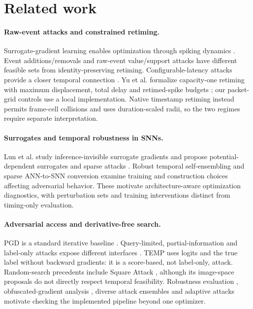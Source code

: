 \section{Related work}\label{sec:related}
\paragraph{Raw-event attacks and constrained retiming.}
Surrogate-gradient learning enables optimization through spiking dynamics \cite{neftci2019}. Event additions/removals \cite{buchel2022attacks} and raw-event value/support attacks \cite{yao2024rawevent} have different feasible sets from identity-preserving retiming. Configurable-latency attacks provide a closer temporal connection \cite{du2026latencies}. Yu et al. formalize capacity-one retiming with maximum displacement, total delay and retimed-spike budgets \cite{yu2026}; our packet-grid controls use a local implementation. Native timestamp retiming instead permits frame-cell collisions and uses duration-scaled radii, so the two regimes require separate interpretation.

\paragraph{Surrogates and temporal robustness in SNNs.}
Lun et al. study inference-invisible surrogate gradients and propose potential-dependent surrogates and sparse attacks \cite{lun2025surrogate}. Robust temporal self-ensembling \cite{wang2026rte} and sparse ANN-to-SNN conversion \cite{schmolli2025sparse} examine training and construction choices affecting adversarial behavior. These motivate architecture-aware optimization diagnostics, with perturbation sets and training interventions distinct from timing-only evaluation.

\paragraph{Adversarial access and derivative-free search.}
PGD is a standard iterative baseline \cite{madry2018}. Query-limited, partial-information and label-only attacks expose different interfaces \cite{ilyas2018queries}. TEMP uses logits and the true label without backward gradients: it is a score-based, not label-only, attack. Random-search precedents include Square Attack \cite{andriushchenko2020square}, although its image-space proposals do not directly respect temporal feasibility. Robustness evaluation \cite{carlini2019}, obfuscated-gradient analysis \cite{athalye2018obfuscated}, diverse attack ensembles \cite{croce2020reliable} and adaptive attacks \cite{tramer2020adaptive} motivate checking the implemented pipeline beyond one optimizer.

